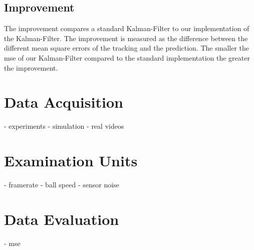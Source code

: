 \documentclass[titlepage, a4paper, 11pt]{scrartcl}
\begin{document}
\subsection{Improvement}

The improvement compares a standard Kalman-Filter to our implementation of the Kalman-Filter.
The improvement is measured as the difference between the different mean square errors of the tracking and the prediction.
The smaller the mse of our Kalman-Filter compared to the standard implementation the greater the improvement.

\section{Data Acquisition}

- experiments
- simulation
- real videos

\section{Examination Units}

- framerate
- ball speed
- sensor noise

\section{Data Evaluation}

- mse

 

\end{document}

